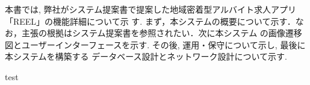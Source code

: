 本書では, 弊社がシステム提案書で提案した地域密着型アルバイト求人アプリ「REEL」の機能詳細について示
す. まず，本システムの概要について示す．なお，主張の根拠はシステム提案書を参照されたい．次に本システム
の画像遷移図とユーザーインターフェースを示す. その後, 運用・保守について示し, 最後に本システムを構築する
データベース設計とネットワーク設計について示す.

test